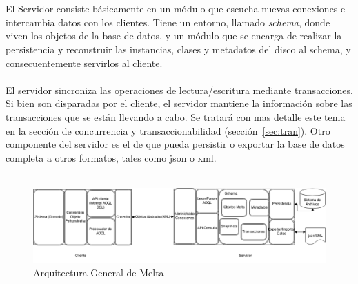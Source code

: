 \documentclass{melta}
\begin{document}
\\\\
El Servidor consiste básicamente en un módulo que escucha nuevas conexiones e intercambia datos con los clientes. Tiene un entorno, llamado \textit{schema}, donde viven los objetos de la base de datos, y un módulo que se encarga de realizar la persistencia y reconstruir las instancias, clases y metadatos del disco al schema, y consecuentemente servirlos al cliente.  
\\\\
El servidor sincroniza las operaciones de lectura/escritura mediante transacciones. Si bien son disparadas por el cliente, el servidor mantiene la información sobre las transacciones que se están llevando a cabo. Se tratará con mas detalle este tema en la sección de concurrencia y transaccionabilidad (sección~\ref{sec:tran}).
Otro componente del servidor es el de que pueda persistir o exportar la base de datos completa a otros formatos, tales como json o xml.
\\\\
\begin{figure}
\centering
\includegraphics[width=19cm]{MeltaArchitecture}
\caption{Arquitectura General de Melta}
\label{fig:flies}
\end{figure}
\end{document}
